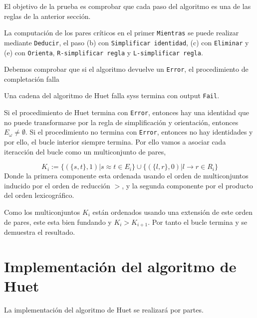 \begin{demo}
  El objetivo de la prueba es comprobar que cada paso del algoritmo es
  una de las reglas de la anterior sección.
  
  La computación de los pares críticos en el primer \texttt{Mientras}
  se puede realizar mediante \texttt{Deducir}, el paso (b) con
  \texttt{Simplificar identidad}, (c) con \texttt{Eliminar} y (e) con
  \texttt{Orienta}, \texttt{R-simplificar regla} y
  \texttt{L-simplificar regla}.
\end{demo}

Debemos comprobar que si el algoritmo devuelve un \texttt{Error}, el
procedimiento de completación falla

\begin{lema}
Una cadena del algoritmo de Huet falla syss termina con output \texttt{Fail}.
\end{lema}

\begin{demo}
  Si el procedimiento de Huet termina con \texttt{Error}, entonces hay
  una identidad que no puede transformarse por la regla de
  simplificación y orientación, entonces $E_\omega \not = \emptyset$.
  Si el procedimiento no termina con \texttt{Error}, entonces no hay
  identidades y por ello, el bucle interior siempre termina. Por ello
  vamos a asociar cada iteracción del bucle como un multiconjunto de
  pares,

  \[
    K_i := \{ ( \{s,t \},1) | s \approx t \in E_i \} \cup \{ ( \{l,r
    \},0) | l \rightarrow r \in R_i \}
  \]
  Donde la primera componente esta ordenada usando el orden de
  multiconjuntos inducido por el orden de reducción $>$, y la segunda
  componente por el producto del orden lexicográfico.

  Como los multiconjuntos $K_i$ están ordenados usando una extensión
  de este orden de pares, este esta bien fundando y $K_i >
  K_{i+1}$. Por tanto el bucle termina y se demuestra el resultado.
\end{demo}

\section{Implementación del algoritmo de Huet}

La implementación del algoritmo de Huet se realizará por partes.

